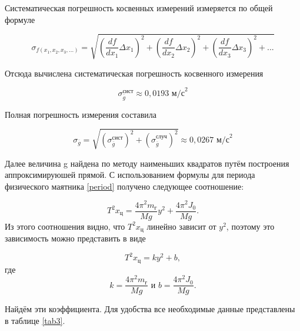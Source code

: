 \documentclass[a4paper,12pt]{article} %
\begin{document}
Систематическая погрешность косвенных измерений измеряется по общей формуле

\begin{equation}
    \sigma_{f(x_1, x_2, x_3, ...) } = \sqrt{(\frac{df}{dx_1}\Delta x_1)^2 + (\frac{df}{dx_2}\Delta x_2)^2 +(\frac{df}{dx_3}\Delta x_3)^2 + ...}
\end{equation}

Отсюда вычислена систематическая погрешность косвенного измерения

\begin{equation}
    \sigma_{\overline{g}}^{\text{сист}} \approx 0,0193 \text{ м/с}^2
\end{equation}

Полная погрешность измерения составила 

\begin{equation}
     \sigma_{\overline{g}} = \sqrt{ (\sigma_{\overline{g}}^{\text{сист}})^2 +  (\sigma_{\overline{g}}^{\text{случ}})^2} \approx 0,0267 \text{ м/с}^2
\end{equation}

Далее величина g найдена по методу наименьших квадратов путём построения аппроксимируюшей прямой. С использованием формулы для периода физического маятника \eqref{period} получено следующее соотношение:

\begin{equation}
T^2x_\text{ц}=\frac{4\pi^2m_\text{г}}{Mg}y^2+\frac{4\pi^2J_0}{Mg}.
\end{equation}
Из этого соотношения видно, что $ T^2x_\text{ц} $ линейно зависит от $ y^2 $, поэтому это зависимость можно представить в виде

\begin{equation}
T^2x_\text{ц}=ky^2+b,
\end{equation}
где
\begin{equation}\label{koef}
k=\frac{4\pi^2m_\text{г}}{Mg} \text{ и }  b = \frac{4\pi^2J_0}{Mg}.
\end{equation}

Найдём эти коэффициента. Для удобства все необходимые данные представлены в таблице \ref{tab3}.
\end{document}

